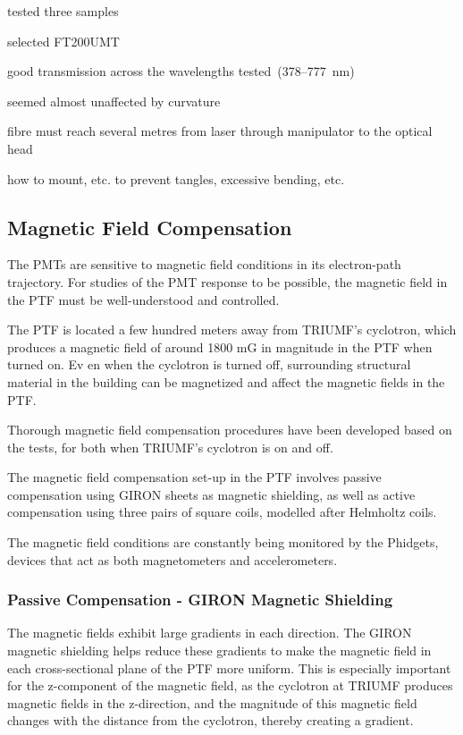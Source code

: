 tested three samples

selected FT200UMT

good transmission across the wavelengths tested~(378--777~nm)

seemed almost unaffected by curvature

fibre must reach several metres from laser through manipulator to the
optical head

how to mount, etc. to prevent tangles, excessive bending, etc.


\subsection{Magnetic Field Compensation}
\label{Sec:MagFieldCompensation}

The PMTs are sensitive to magnetic field conditions in its electron-path trajectory. For studies of the PMT response to be possible, the magnetic field in the PTF must be well-understood and controlled.

The PTF is located a few hundred meters away from TRIUMF's cyclotron, which produces a magnetic field of around 1800 mG in magnitude in the PTF when turned on. Ev
en when the cyclotron is turned off, surrounding structural material in the building can be magnetized and affect the magnetic fields in the PTF. 

Thorough magnetic field compensation procedures have been developed based on the tests, for both when TRIUMF's cyclotron is on and off.

The magnetic field compensation set-up in the PTF involves passive compensation using GIRON sheets as magnetic shielding, as well as active compensation using three pairs of square coils, modelled after Helmholtz coils.

The magnetic field conditions are constantly being monitored by the Phidgets, devices that act as both magnetometers and accelerometers.

\subsubsection{Passive Compensation - GIRON Magnetic Shielding}

The magnetic fields exhibit large gradients in each direction. The GIRON magnetic shielding helps reduce these gradients to make the magnetic field in each cross-sectional plane of the PTF more uniform. This is especially important for the z-component of the magnetic field, as the cyclotron at TRIUMF produces magnetic fields in the z-direction, and the magnitude of this magnetic field changes with the distance from the cyclotron, thereby creating a gradient.

